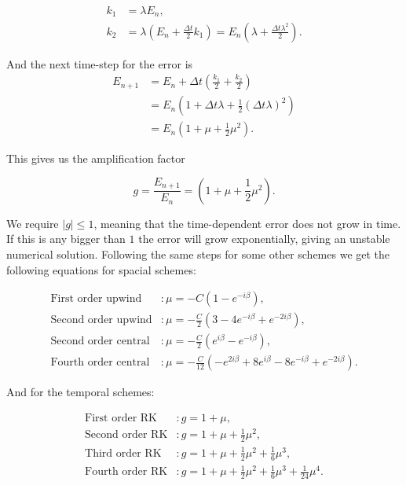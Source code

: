 \documentclass{article}
\begin{document}
\begin{align*}
    k_1 &= \lambda E_n,\\
    k_2 &= \lambda \left(E_n+\frac{\Delta t}{2}k_1 \right) = E_n \left( \lambda + \frac{\Delta t \lambda^2}{2} \right).
\end{align*}

And the next time-step for the error is
\begin{align*}
    E_{n+1} &= E_n + \Delta t \left( \frac{k_1}{2} +\frac{k_2}{2} \right)\\
    &= E_n \left( 1 +\Delta t \lambda + \frac{1}{2}\left( \Delta t\lambda \right)^2 \right)\\
    & = E_n \left( 1 + \mu + \frac{1}{2}\mu^2  \right).
\end{align*}

This gives us the amplification factor 

\begin{equation}
    g = \frac{E_{n+1}}{E_n} = \left( 1 + \mu + \frac{1}{2}\mu^2  \right).
\end{equation}

We require $|g|\leq 1$, meaning that the time-dependent error does not grow in time. If this is any bigger than $1$ the error will grow exponentially, giving an unstable numerical solution. Following the same steps for some other schemes we get the following equations for spacial schemes:

\begin{align*}
    \text{First order upwind} &: \mu=-C\left(1-e^{-i\beta}\right),\\
    \text{Second order upwind} &: \mu=-\frac{C}{2}\left(3-4e^{-i\beta}+e^{-2i\beta}\right),\\
    \text{Second order central} &: \mu = -\frac{C}{2}\left(e^{i\beta} - e^{-i\beta}\right),\\
    \text{Fourth order central} &: \mu = - \frac{C}{12}\left(-e^{2i\beta}+8e^{i\beta}-8e^{-i\beta}+e^{-2i\beta}\right).
\end{align*}

And for the temporal schemes:

\begin{align*}
    \text{First order RK} &: g = 1+\mu,\\
    \text{Second order RK} &: g = 1+\mu + \frac{1}{2}\mu^2,\\
    \text{Third order RK} &: g = 1+\mu + \frac{1}{2}\mu^2+\frac{1}{6}\mu^3,\\
    \text{Fourth order RK} &: g = 1+\mu + \frac{1}{2}\mu^2+\frac{1}{6}\mu^3+\frac{1}{24}\mu^4.
\end{align*}
\end{document}
